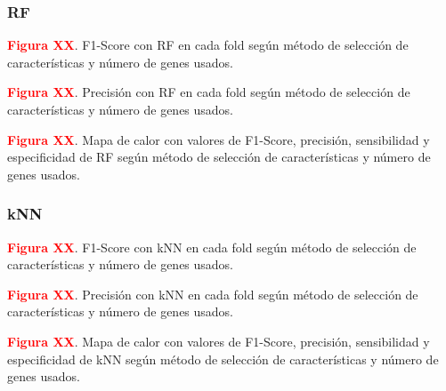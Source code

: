 \newpage
\subsubsection{RF}

\textbf{\textcolor{red}{Figura XX}}. F1-Score con RF en cada fold según método de selección de características y número de genes usados.

\newpage
\textbf{\textcolor{red}{Figura XX}}. Precisión con RF en cada fold según método de selección de características y número de genes usados.

\newpage
\textbf{\textcolor{red}{Figura XX}}. Mapa de calor con valores de F1-Score, precisión, sensibilidad y especificidad de RF según método de selección de características y número de genes usados.

\newpage
\subsubsection{kNN}

\textbf{\textcolor{red}{Figura XX}}. F1-Score con kNN en cada fold según método de selección de características y número de genes usados.

\newpage
\textbf{\textcolor{red}{Figura XX}}. Precisión con kNN en cada fold según método de selección de características y número de genes usados.


\newpage
\textbf{\textcolor{red}{Figura XX}}. Mapa de calor con valores de F1-Score, precisión, sensibilidad y especificidad de kNN según método de selección de características y número de genes usados.

